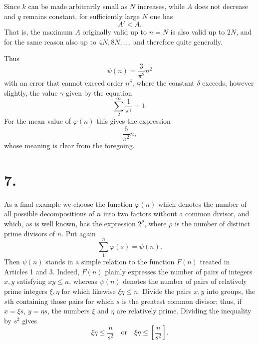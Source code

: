 \documentclass[11pt]{article}
\newcommand{\floor}[1]{\left[#1\right]}
\begin{document}
Since $k$ can be made arbitrarily small as $N$ increases, while $A$ does not decrease and $q$ remains constant, for sufficiently large $N$ one has
\[
 A'<A.
\]
That is, the maximum $A$ originally valid up to $n=N$ is also valid up to $2N$, and for the same reason also up to $4N,8N,\ldots$, and therefore quite generally.

Thus
\[
 \psi(n)=\frac3{\pi^2}n^2
\]
with an error that cannot exceed order $n^\delta$, where the constant $\delta$ exceeds, however slightly, the value $\gamma$ given by the equation
\[
 \sum_{2}^{\infty}\frac1{s^\gamma}=1.
\]
For the mean value of $\varphi(n)$ this gives the expression
\[
 \frac6{\pi^2}n,
\]
whose meaning is clear from the foregoing.

\section*{7.}

As a final example we choose the function $\varphi(n)$ which denotes the number of all possible decompositions of $n$ into two factors without a common divisor, and which, as is well known, has the expression $2^\rho$, where $\rho$ is the number of distinct prime divisors of $n$. Put again
\[
 \sum_{1}^{n}\varphi(s)=\psi(n).
\]
Then $\psi(n)$ stands in a simple relation to the function $F(n)$ treated in Articles 1 and 3. Indeed, $F(n)$ plainly expresses the number of pairs of integers $x,y$ satisfying $xy\leq n$, whereas $\psi(n)$ denotes the number of pairs of relatively prime integers $\xi,\eta$ for which likewise $\xi\eta\leq n$. Divide the pairs $x,y$ into groups, the $s$th containing those pairs for which $s$ is the greatest common divisor; thus, if $x=\xi s$, $y=\eta s$, the numbers $\xi$ and $\eta$ are relatively prime. Dividing the inequality by $s^2$ gives
\[
 \xi\eta\leq\frac n{s^2}\quad \text{or}\quad
 \xi\eta\leq\floor{\frac n{s^2}}.
\]
\end{document}
